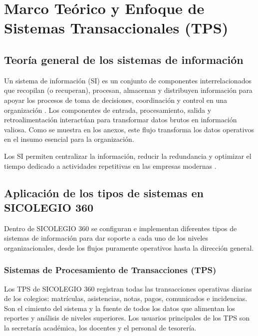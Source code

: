 \documentclass[12pt,a4paper,oneside]{report}
\begin{document}
\chapter{Marco Teórico y Enfoque de Sistemas Transaccionales (TPS)}

\section{Teoría general de los sistemas de información}

Un sistema de información (SI) es un conjunto de componentes interrelacionados que recopilan (o recuperan), procesan, almacenan y distribuyen información para apoyar los procesos de toma de decisiones, coordinación y control en una organización \citep{laudon2016}. Los componentes de entrada, procesamiento, salida y retroalimentación interactúan para transformar datos brutos en información valiosa. Como se muestra en los anexos, este flujo transforma los datos operativos en el insumo esencial para la organización.

Los SI permiten centralizar la información, reducir la redundancia y optimizar el tiempo dedicado a actividades repetitivas en las empresas modernas \citep{obrien2009}.

\section{Aplicación de los tipos de sistemas en SICOLEGIO 360}

Dentro de SICOLEGIO 360 se configuran e implementan diferentes tipos de sistemas de información para dar soporte a cada uno de los niveles organizacionales, desde los flujos puramente operativos hasta la dirección general.

\subsection{Sistemas de Procesamiento de Transacciones (TPS)}
Los TPS de SICOLEGIO 360 registran todas las transacciones operativas diarias de los colegios: matrículas, asistencias, notas, pagos, comunicados e incidencias. Son el cimiento del sistema y la fuente de todos los datos que alimentan los reportes y análisis de niveles superiores. Los usuarios principales de los TPS son la secretaría académica, los docentes y el personal de tesorería.
\end{document}
